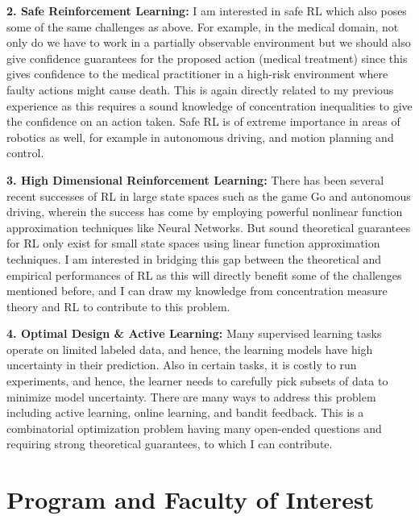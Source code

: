 \documentclass{article}
\begin{document}
\textbf{2. Safe Reinforcement Learning:} I am interested in safe RL which also poses some of the same challenges as above. For example, in the medical domain, not only do we have to work in a partially observable environment but we should also give confidence guarantees for the proposed action (medical treatment) since this gives confidence to the medical
practitioner in a high-risk environment where faulty actions might cause death. This is again directly related to my previous experience as this requires a sound knowledge of concentration inequalities to give the confidence on an action taken. Safe RL is of extreme importance in areas of robotics as well, for example in autonomous driving,
and motion planning and control.


\textbf{3. High Dimensional Reinforcement Learning:} There has been several recent successes of RL in large state spaces such as the game Go and autonomous driving, wherein the success has come by employing powerful nonlinear function approximation techniques like Neural Networks. But sound theoretical guarantees for RL only exist
for small state spaces using linear function approximation techniques. I am interested in bridging this gap between the theoretical and empirical performances of RL as this will directly benefit some of the challenges mentioned before, and I can draw my knowledge from concentration measure theory and RL to contribute to this problem.


\textbf{4. Optimal Design \& Active Learning:} Many supervised learning tasks operate on limited labeled data, and hence, the learning models have high uncertainty in their prediction. Also in certain tasks, it is costly to run experiments, and hence, the learner needs to carefully pick subsets of data to minimize model uncertainty. There are many ways to address this problem including active learning, online learning, and bandit feedback. This is a combinatorial optimization problem having many open-ended questions and requiring strong theoretical guarantees, to which I can contribute.

\vspace*{-2em}
\section{Program and Faculty of Interest}
\vspace*{-1em}
\end{document}
